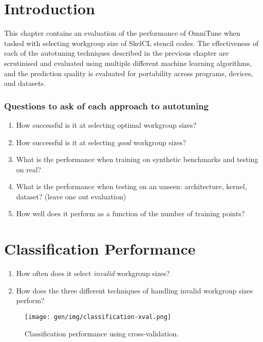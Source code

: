 \section{Introduction}

This chapter contains an evaluation of the performance of OmniTune
when tasked with selecting workgroup size of SkelCL stencil codes. The
effectiveness of each of the autotuning techniques described in the
previous chapter are scrutinised and evaluated using multiple
different machine learning algorithms, and the prediction quality is
evaluated for portability across programs, devices, and datasets.


\subsubsection{Questions to ask of each approach to autotuning}

\begin{enumerate}
\item How successful is it at selecting optimal workgroup sizes?
\item How successful is it at selecting \emph{good} workgroup sizes?
\item What is the performance when training on synthetic benchmarks
  and testing on real?
\item What is the performance when testing on an unseen: architecture,
  kernel, dataset? (leave one out evaluation)
\item How well does it perform as a function of the number of training
  points?
\end{enumerate}

\section{Classification Performance}

\begin{enumerate}
\item How often does it select \emph{invalid} workgroup sizes?
\item How does the three different techniques of handling invalid
  workgroup sizes perform?
\end{enumerate}

\begin{figure}
\centering
\texttt{[image: gen/img/classification-xval.png]}
\caption{%
  Classification performance using cross-validation.%
}
\end{figure}

